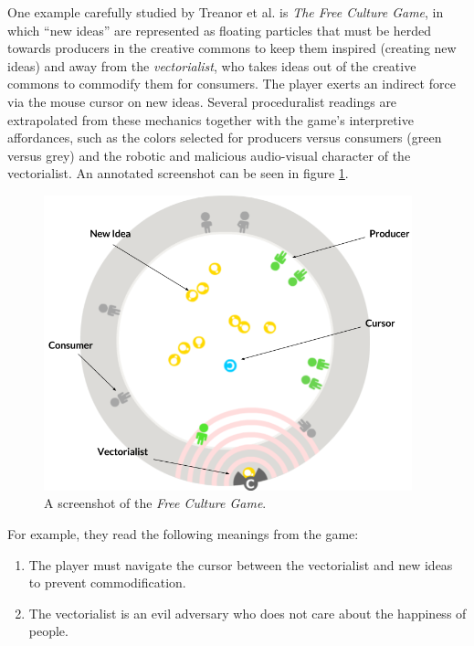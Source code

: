 \documentclass[12pt]{report}
\begin{document}
One example carefully studied by Treanor et al. is {\em The Free Culture
Game}, in which ``new ideas'' are represented as floating particles that
must be herded towards producers in the creative commons to keep them
inspired (creating new ideas) and away from the {\em vectorialist}, who
takes ideas out of the creative commons to commodify them for consumers.
The player exerts an indirect force via the mouse cursor on new ideas.
Several proceduralist readings are extrapolated from these mechanics
together with the game's interpretive affordances, such as the colors
selected for producers versus consumers (green versus grey) and the robotic
and malicious audio-visual character of the vectorialist. An annotated screenshot can be seen in figure \ref{fig:fcg_screenshot}.  

\begin{figure}[ht]
\centering
\includegraphics[width=0.95\textwidth]{figures/Free_Culture.png}
\caption{A screenshot of the \textit{Free Culture Game}.}
\label{fig:fcg_screenshot}
\end{figure}

For example, they
read the following meanings from the game:

\begin{enumerate}
\item The player must navigate the cursor between the
  vectorialist and new ideas to prevent commodification.
\item The vectorialist is an evil adversary who does not care
  about the happiness of people.
\end{enumerate}
\end{document}
